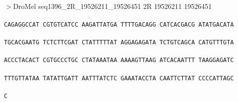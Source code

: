 \documentclass[11pt,twoside,reqno,a4paper]{article}
\begin{document}
\\
$>$DroMel	seq1396\_2R\_19526211\_19526451	2R	19526211	19526451 \\
 \\
\texttt{CAGAGGCCAT	CGTGTCATCC	AAGATTATGA	TTTTGACAGG	CATCACGACG	ATATGACATA	\\
\hspace*{1\charwidth}\hspace*{1\charwidth}\hspace*{1\charwidth}\hspace*{1\charwidth}\hspace*{1\charwidth}\hspace*{1\charwidth}\\
TGCACGAATG	TCTCTTCGAT	CTATTTTTAT	AGGAGAGATA	TCTGTCAGCA	CATGTTTGTA	\\
\hspace*{1\charwidth}\hspace*{1\charwidth}\hspace*{1\charwidth}\hspace*{1\charwidth}\hspace*{1\charwidth}\hspace*{1\charwidth}\\
ACCCTACACT	CGTGCCCTGC	CTATAAATAA	AAAAGTTAAG	ATCACAATTT	TAAGGAGATC	\\
\hspace*{1\charwidth}\hspace*{1\charwidth}\hspace*{1\charwidth}\hspace*{1\charwidth}\hspace*{1\charwidth}\hspace*{1\charwidth}\\
TTTGTTATAA	TATATTGATT	AATTTATCTC	GAAATACCTA	CAATTCTTAT	CCCCATTAGC	\\
\hspace*{1\charwidth}\hspace*{1\charwidth}\hspace*{1\charwidth}\hspace*{1\charwidth}\hspace*{1\charwidth}\hspace*{1\charwidth}\\
C\\
\\
\\
\\
\\
\\
\\
\\
}
\end{document}
